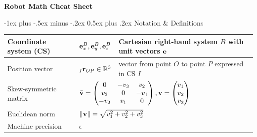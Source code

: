 \documentclass[10pt,landscape,a4paper]{article}
\makeatletter
\renewcommand{\section}{\@startsection{section}{1}{0mm}%
                                {-1ex plus -.5ex minus -.2ex}%
                                {0.5ex plus .2ex}%
                                {\normalfont\large\bfseries}}
\makeatother
\begin{document}
\raggedright
\footnotesize
\begin{multicols}{2}


\setlength{\premulticols}{1pt}
\setlength{\postmulticols}{1pt}
\setlength{\multicolsep}{1pt}
\setlength{\columnsep}{2pt}

\begin{center}
     \Large{\textbf{Robot Math Cheat Sheet}} \\
\end{center}
\section{Notation \& Definitions  }
\begin{tabular}{|l|l|l|}
\hline
Coordinate system (CS) & ${\mathbf e_x^B,\mathbf e_y^B,\mathbf e_z^B }$ & Cartesian right-hand system $B$ with unit vectors $\mathbf e$  \\ \hline
Position vector & ${}_I\mathbf r_{OP} \in \mathbb{R}^3 $ & vector from point $O$ to point $P$ expressed in CS $I$ \\ \hline 
Skew-symmetric matrix & \multicolumn{2}{l|}{$\tilde{\mathbf v} = \begin{pmatrix} 0 & -v_3 & v_2 \\ v_3 & 0 & -v_1 \\ -v_2 & v_1 & 0 \end{pmatrix}, \mathbf v = \begin{pmatrix} v_1 \\ v_2 \\ v_3\end{pmatrix}$}  \\ \hline
Euclidean norm & \multicolumn{2}{l|}{$\lVert \mathbf v \rVert = \sqrt{v_1^2 + v_2^2 + v_3^2}$} \\ \hline
Machine precision & $\epsilon$ & \\ \hline
\end{tabular}


\end{multicols}
\end{document}

